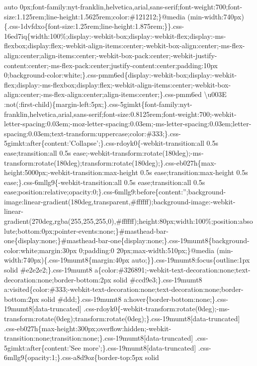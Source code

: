 auto
0px;font-family:nyt-franklin,helvetica,arial,sans-serif;font-weight:700;font-size:1.125rem;line-height:1.5625rem;color:\#121212;\}@media
(min-width:740px)\{.css-1dvfdxo\{font-size:1.25rem;line-height:1.875rem;\}\}.css-16ed7iq\{width:100\%;display:-webkit-box;display:-webkit-flex;display:-ms-flexbox;display:flex;-webkit-align-items:center;-webkit-box-align:center;-ms-flex-align:center;align-items:center;-webkit-box-pack:center;-webkit-justify-content:center;-ms-flex-pack:center;justify-content:center;padding:10px
0;background-color:white;\}.css-pmm6ed\{display:-webkit-box;display:-webkit-flex;display:-ms-flexbox;display:flex;-webkit-align-items:center;-webkit-box-align:center;-ms-flex-align:center;align-items:center;\}.css-pmm6ed
\textbackslash{}u003E
:not(:first-child)\{margin-left:5px;\}.css-5gimkt\{font-family:nyt-franklin,helvetica,arial,sans-serif;font-size:0.8125rem;font-weight:700;-webkit-letter-spacing:0.03em;-moz-letter-spacing:0.03em;-ms-letter-spacing:0.03em;letter-spacing:0.03em;text-transform:uppercase;color:\#333;\}.css-5gimkt:after\{content:'Collapse';\}.css-rdoyk0\{-webkit-transition:all
0.5s ease;transition:all 0.5s
ease;-webkit-transform:rotate(180deg);-ms-transform:rotate(180deg);transform:rotate(180deg);\}.css-eb027h\{max-height:5000px;-webkit-transition:max-height
0.5s ease;transition:max-height 0.5s
ease;\}.css-6mllg9\{-webkit-transition:all 0.5s ease;transition:all 0.5s
ease;position:relative;opacity:0;\}.css-6mllg9:before\{content:'';background-image:linear-gradient(180deg,transparent,\#ffffff);background-image:-webkit-linear-gradient(270deg,rgba(255,255,255,0),\#ffffff);height:80px;width:100\%;position:absolute;bottom:0px;pointer-events:none;\}\#masthead-bar-one\{display:none;\}\#masthead-bar-one\{display:none;\}.css-19mumt8\{background-color:white;margin:30px
0;padding:0 20px;max-width:510px;\}@media
(min-width:740px)\{.css-19mumt8\{margin:40px
auto;\}\}.css-19mumt8:focus\{outline:1px solid \#e2e2e2;\}.css-19mumt8
a\{color:\#326891;-webkit-text-decoration:none;text-decoration:none;border-bottom:2px
solid \#ccd9e3;\}.css-19mumt8
a:visited\{color:\#333;-webkit-text-decoration:none;text-decoration:none;border-bottom:2px
solid \#ddd;\}.css-19mumt8
a:hover\{border-bottom:none;\}.css-19mumt8{[}data-truncated{]}
.css-rdoyk0\{-webkit-transform:rotate(0deg);-ms-transform:rotate(0deg);transform:rotate(0deg);\}.css-19mumt8{[}data-truncated{]}
.css-eb027h\{max-height:300px;overflow:hidden;-webkit-transition:none;transition:none;\}.css-19mumt8{[}data-truncated{]}
.css-5gimkt:after\{content:'See more';\}.css-19mumt8{[}data-truncated{]}
.css-6mllg9\{opacity:1;\}.css-a8d9oz\{border-top:5px solid
